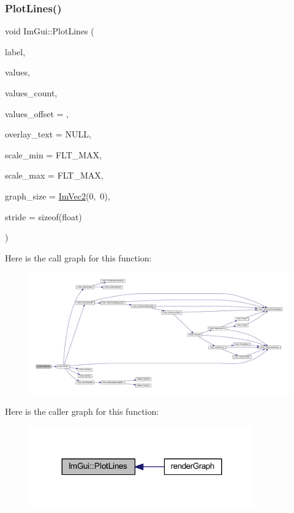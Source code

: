 \subsubsection{\texorpdfstring{Plot\+Lines()}{PlotLines()}\hspace{0.1cm}{\footnotesize\ttfamily [1/2]}}
{\footnotesize\ttfamily void Im\+Gui\+::\+Plot\+Lines (\begin{DoxyParamCaption}\item[{const char $\ast$}]{label,  }\item[{const float $\ast$}]{values,  }\item[{int}]{values\+\_\+count,  }\item[{int}]{values\+\_\+offset = {},  }\item[{const char $\ast$}]{overlay\+\_\+text = {\ttfamily NULL},  }\item[{float}]{scale\+\_\+min = {\ttfamily FLT\+\_\+MAX},  }\item[{float}]{scale\+\_\+max = {\ttfamily FLT\+\_\+MAX},  }\item[{\mbox{\hyperlink{struct_im_vec2}{Im\+Vec2}}}]{graph\+\_\+size = {\ttfamily \mbox{\hyperlink{struct_im_vec2}{Im\+Vec2}}(0,~0)},  }\item[{int}]{stride = {\ttfamily sizeof(float)} }\end{DoxyParamCaption})}

Here is the call graph for this function\+:
\nopagebreak
\begin{figure}[H]
\begin{center}
\leavevmode
\includegraphics[width=350pt]{namespace_im_gui_a2bc21c56e4796855313804086cca114f_cgraph}
\end{center}
\end{figure}
Here is the caller graph for this function\+:
\nopagebreak
\begin{figure}[H]
\begin{center}
\leavevmode
\includegraphics[width=275pt]{namespace_im_gui_a2bc21c56e4796855313804086cca114f_icgraph}
\end{center}
\end{figure}
\mbox{\label{namespace_im_gui_a94a2645d45c96da35b834dc7db93a9f1}} 
